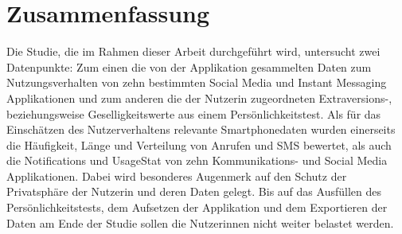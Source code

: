\section{Zusammenfassung}
\label{ch:Entwurf:sec:zusammenfassung}

Die Studie, die im Rahmen dieser Arbeit durchgeführt wird, untersucht zwei Datenpunkte:
Zum einen die von der Applikation gesammelten Daten zum Nutzungsverhalten von zehn bestimmten Social Media und Instant Messaging Applikationen
und zum anderen die der Nutzerin zugeordneten Extraversions-, beziehungsweise Geselligkeitswerte aus einem Persönlichkeitstest.
Als für das Einschätzen des Nutzerverhaltens relevante Smartphonedaten wurden einerseits die Häufigkeit, Länge und Verteilung von Anrufen und SMS bewertet,
als auch die Notifications und UsageStat von zehn Kommunikations- und Social Media Applikationen.
Dabei wird besonderes Augenmerk auf den Schutz der Privatsphäre der Nutzerin und deren Daten gelegt.
Bis auf das Ausfüllen des Persönlichkeitstests, dem Aufsetzen der Applikation und dem Exportieren der Daten am Ende der Studie sollen die Nutzerinnen nicht weiter belastet werden.


